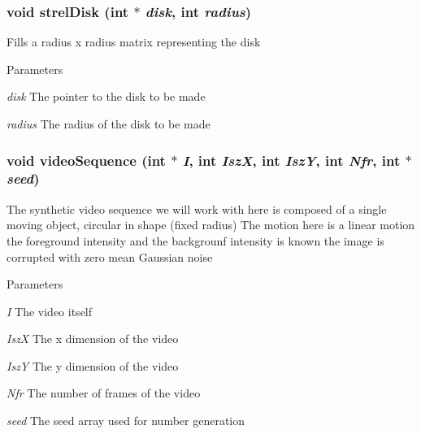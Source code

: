 \hypertarget{ex__particle__CUDA__naive_8cu_a2f03f766b1c044ea6bab007e1975a23f}{
\subsubsection[{strelDisk}]{\setlength{\rightskip}{0pt plus 5cm}void strelDisk (int $\ast$ {\em disk}, \/  int {\em radius})}}
\label{ex__particle__CUDA__naive_8cu_a2f03f766b1c044ea6bab007e1975a23f}
Fills a radius x radius matrix representing the disk 
\begin{DoxyParams}{Parameters}
\item[{\em disk}]The pointer to the disk to be made \item[{\em radius}]The radius of the disk to be made \end{DoxyParams}
\hypertarget{ex__particle__CUDA__naive_8cu_a2925e128f88b60e0904210704e5ff7f5}{
\subsubsection[{videoSequence}]{\setlength{\rightskip}{0pt plus 5cm}void videoSequence (int $\ast$ {\em I}, \/  int {\em IszX}, \/  int {\em IszY}, \/  int {\em Nfr}, \/  int $\ast$ {\em seed})}}
\label{ex__particle__CUDA__naive_8cu_a2925e128f88b60e0904210704e5ff7f5}
The synthetic video sequence we will work with here is composed of a single moving object, circular in shape (fixed radius) The motion here is a linear motion the foreground intensity and the backgrounf intensity is known the image is corrupted with zero mean Gaussian noise 
\begin{DoxyParams}{Parameters}
\item[{\em I}]The video itself \item[{\em IszX}]The x dimension of the video \item[{\em IszY}]The y dimension of the video \item[{\em Nfr}]The number of frames of the video \item[{\em seed}]The seed array used for number generation \end{DoxyParams}
